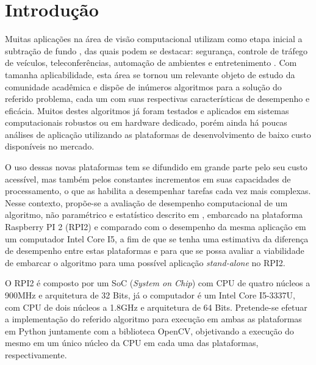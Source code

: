 \documentclass[conference]{IEEEtran}
\begin{document}




%
\IEEEpeerreviewmaketitle



\section{Introdução}
Muitas aplicações na área de visão computacional utilizam como etapa inicial a subtração de fundo \cite{IEEEhowto:sobral}, das quais podem se destacar: segurança, controle de tráfego de veículos, teleconferências, automação de ambientes e entretenimento \cite{IEEEhowto:parolin}. Com tamanha aplicabilidade, esta área se tornou um relevante objeto de estudo da comunidade acadêmica e dispõe de inúmeros algoritmos para a solução do referido problema, cada um com suas respectivas características de desempenho e eficácia. Muitos destes algoritmos já foram testados e aplicados em sistemas computacionais robustos ou em hardware dedicado\cite{IEEEhowto:oliveira}, porém ainda há poucas análises de aplicação utilizando as plataformas de desenvolvimento de baixo custo disponíveis no mercado.

O uso dessas novas plataformas tem se difundido em grande parte pelo seu custo acessível, mas também pelos constantes incrementos em suas capacidades de processamento, o que as habilita a desempenhar tarefas cada vez mais complexas. Nesse contexto, propõe-se a avaliação de desempenho computacional de um algoritmo, não paramétrico e estatístico descrito em \cite{IEEEhowto:horprasert}, embarcado na plataforma Raspberry PI 2 (RPI2) e comparado com o desempenho da mesma aplicação em um computador Intel Core I5, a fim de que se tenha uma estimativa da diferença de desempenho entre estas plataformas e para que se possa avaliar a viabilidade de embarcar o algoritmo para uma possível aplicação \textit{stand-alone} no RPI2.


O RPI2  é composto por um SoC (\textit{System on Chip}) com CPU de quatro núcleos a 900MHz e arquitetura de 32 Bits, já o computador é um Intel Core I5-3337U, com CPU de dois núcleos a 1.8GHz e arquitetura de 64 Bits. Pretende-se efetuar a implementação do referido algoritmo para execução em ambas as plataformas em Python juntamente com a biblioteca OpenCV, objetivando a execução do mesmo em um único núcleo da CPU em cada uma das plataformas, respectivamente.
\end{document}
